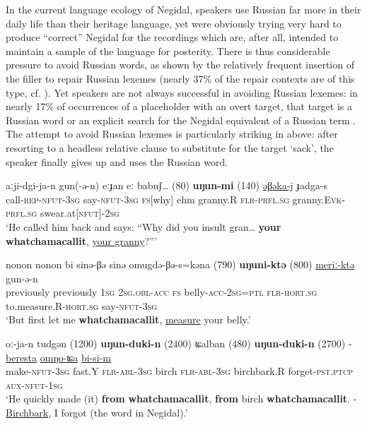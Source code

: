 \documentclass[output=paper]{langscibook}
\begin{document}
In the current language ecology of Negidal, speakers use Russian far more in their daily life than their heritage language, yet were obviously trying very hard to produce “correct” Negidal for the recordings which are, after all, intended to maintain a sample of the language for posterity. There is thus considerable pressure to avoid Russian words, as shown by the relatively frequent insertion of the filler to repair Russian lexemes (nearly 37\% of the repair contexts are of this type, cf. ). Yet speakers are not always successful in avoiding Russian lexemes: in nearly 17\% of occurrences of a placeholder with an overt target, that target is a Russian word  or an explicit search for the Negidal equivalent of a Russian term . The attempt to avoid Russian lexemes is particularly striking in  above: after resorting to a headless relative clause to substitute for the target ‘sack’, the speaker finally gives up and uses the Russian word.


\ea \label{ex:pakendorf:53}
\gll aːji-dgi-ja-n gun(-ə-n) eːɟan eː babuʃ…
	\textup{(80)} \textbf{uŋun-mi} \textup{(140)}
	\uline{əβəka-j} ɟadga-s\\
     call-\textsc{rep-nfut-3sg} say-\textsc{nfut-3sg} \textsc{fs}[why] ehm granny.R
     {} \textsc{flr-prfl.sg} {}
     granny.\textsc{Evk-prfl.sg} swear.at[\textsc{nfut]-2sg}\\
\glt ‘He called him back and says: “Why did you insult gran… \textbf{your} \textbf{whatchamacallit}, \uline{your granny}?”’ 
\z


\ea \label{ex:pakendorf:54}
\gll nonon nonon bi sinə-βə sinə omugdə-βə-s=kəna
	\textup{(790)} \textbf{uŋuni-ktə} \textup{(800)}
	\uline{meriː-ktə} gun-ə-n\\
     previously previously \textsc{1sg} \textsc{2sg.obl-acc} \textsc{fs} belly-\textsc{acc-2sg=ptl}
     {} \textsc{flr-hort.sg} {}
     to.measure.R-\textsc{hort.sg} say-\textsc{nfut-3sg}\\
\glt ‘But first let me \textbf{whatchamacallit}, \uline{measure} your belly.’ 
\z

\ea \label{ex:pakendorf:55}
\gll oː-ja-n tudgən
	\textup{(1200)} \textbf{uŋun-duki-n} \textup{(2400)}
	ʨalban
	\textup{(480)} \textbf{uŋun-duki-n} \textup{(2700)}
	- \uline{beresta} \uline{omŋo-ʨa} \uline{bi-si-m}\\
     make-\textsc{nfut-3sg} fast.Y
     {} \textsc{flr-abl-3sg} {}
     birch
     {} \textsc{flr-abl-3sg} {}
     {} birchbark.R forget-\textsc{pst.ptcp} \textsc{aux-nfut-1sg}\\
\glt ‘He quickly made (it) \textbf{from} \textbf{whatchamacallit}, \textbf{from} birch \textbf{whatchamacallit}. - \uline{Birchbark}, I forgot (the word in Negidal).’ 
\z
\end{document}
